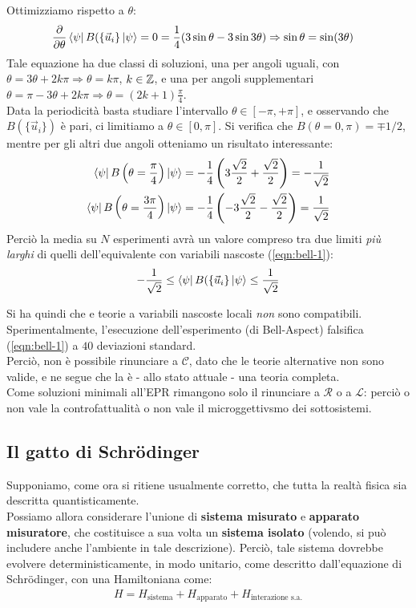 \documentclass[../../FisicaTeorica.tex]{subfiles}
\begin{document}
Ottimizziamo rispetto a $\theta$:
\begin{align*}
\frac{\partial}{\partial \theta} \Bra{\psi}B(\{\vec{u}_i\}\Ket{\psi} = 0 &= \frac{1}{4}(3\sin\theta - 3\sin 3\theta) \Rightarrow  \sin\theta = \sin(3\theta)
\end{align*}
Tale equazione ha due classi di soluzioni, una per angoli uguali, con $\theta = 3\theta +2k\pi \Rightarrow \theta = k\pi$, $k \in \mathbb{Z}$, e una per angoli supplementari $\theta = \pi-3\theta + 2k\pi\Rightarrow \theta = (2k+1)\frac{\pi}{4}$.\\
Data la periodicità basta studiare l'intervallo $\theta \in [-\pi, +\pi]$, e osservando che $B(\{\vec{u}_i\})$ è pari, ci limitiamo a $\theta \in [0,\pi]$. Si verifica che $B(\theta = 0,\pi)=\mp1/2$, mentre per gli altri due angoli otteniamo un risultato interessante:
\begin{align*}
 \Bra{\psi}B\left(\theta=\frac{\pi}{4}\right) \Ket{\psi} &= -\frac{1}{4}\left(3\frac{\sqrt{2}}{2}+\frac{\sqrt{2}}{2}\right)=-\frac{1}{\sqrt{2}}\\
 \Bra{\psi}B\left(\theta=\frac{3\pi}{4}\right) \Ket{\psi} &= -\frac{1}{4}\left(-3\frac{\sqrt{2}}{2}-\frac{\sqrt{2}}{2}\right) = \frac{1}{\sqrt{2}}
\end{align*}
Perciò la media su $N$ esperimenti avrà un valore compreso tra due limiti \textit{più larghi} di quelli dell'equivalente con variabili nascoste (\ref{eqn:bell-1}):
\begin{align}
-\frac{1}{\sqrt{2}} \leq \Bra{\psi} B(\{\vec{u}_i\}\Ket{\psi} \leq \frac{1}{\sqrt{2}}
\label{eqn:bell-2}
\end{align}

Si ha quindi che \MQ e teorie a variabili nascoste locali \textit{non} sono compatibili. Sperimentalmente, l'esecuzione dell'esperimento (di Bell-Aspect) falsifica (\ref{eqn:bell-1}) a $40$ deviazioni standard.\\
Perciò, non è possibile rinunciare a $\mathcal{C}$, dato che le teorie alternative non sono valide, e ne segue che la \MQ è - allo stato attuale - una teoria completa.\\

Come soluzioni minimali all'EPR rimangono solo il rinunciare a $\mathcal{R}$ o a $\mathcal{L}$: perciò o non vale la controfattualità o non vale il microggettivsmo dei sottosistemi.

\subsection{Il gatto di Schr\"odinger}
Supponiamo, come ora si ritiene usualmente corretto, che tutta la realtà fisica sia descritta quantisticamente.\\
Possiamo allora considerare l'unione di \textbf{sistema misurato} e \textbf{apparato misuratore}, che costituisce a sua volta un \textbf{sistema isolato} (volendo, si può includere anche l'ambiente in tale descrizione).
Perciò, tale sistema dovrebbe evolvere deterministicamente, in modo unitario, come descritto dall'equazione di Schr\"odinger, con una Hamiltoniana come:
\begin{align*}
H = H_{\text{sistema}} + H_{\text{apparato}} + H_{\text{interazione s.a.}}
\end{align*}
\end{document}

